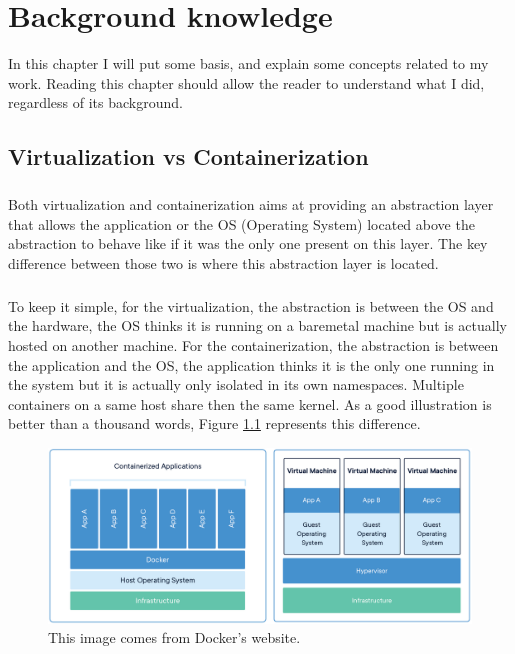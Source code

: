 \chapter{Background knowledge}

In this chapter I will put some basis, and explain some concepts related to my work.  Reading this chapter should allow the reader to understand what I did, regardless of its background.

\section{Virtualization vs Containerization}
\paragraph{}Both virtualization and containerization aims at providing an abstraction layer that allows the application or the OS (Operating System) located above the abstraction to behave like if it was the only one present on this layer.  The key difference between those two is where this abstraction layer is located.  

\paragraph{}To keep it simple, for the virtualization, the abstraction is between the OS and the hardware, the OS thinks it is running on a baremetal machine but is actually hosted on another machine.  For the containerization, the abstraction is between the application and the OS, the application thinks it is the only one running in the system but it is actually only isolated in its own namespaces.  Multiple containers on a same host share then the same kernel.  As a good illustration is better than a thousand words, Figure \ref{fig:virt-vs-cont} represents this difference. 
\begin{figure}[!h]
  \begin{center}
    \includegraphics[width=\linewidth]{images/Virtualization-Containerization.png}
    \caption{This image comes from Docker's website\cite{docker}.}
    \label{fig:virt-vs-cont}
  \end{center}
\end{figure}

